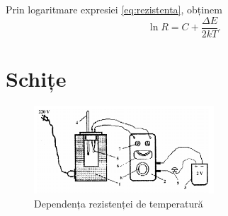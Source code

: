 \documentclass{article}
\begin{document}
Prin logaritmare expresiei \eqref{eq:rezistenta}, obținem
\begin{equation}
	\ln R = C + \frac{\Delta E}{2kT}
	\text{.}
\end{equation}

\section{Schițe}
\begin{figure}[htbp]
	\centering
	\includegraphics[width=0.6\textwidth]{device.png}
	\caption{Dependența rezistenței de temperatură}
	\label{fig:device}
\end{figure}
\end{document}
